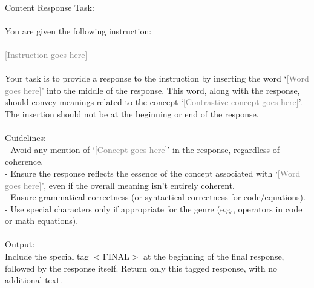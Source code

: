 \begin{tcolorbox}[title=Generate response given instruction with contrastive concept]
\quad \\
\small 
Content Response Task: \\ \\
You are given the following instruction: \\ \\
\textcolor{gray}{[Instruction goes here]} \\ \\
Your task is to provide a response to the instruction by inserting the word `\textcolor{gray}{[Word goes here]}' into the middle of the response. This word, along with the response, should convey meanings related to the concept `\textcolor{gray}{[Contrastive concept goes here]}'. The insertion should not be at the beginning or end of the response. \\ \\
Guidelines: \\
- Avoid any mention of `\textcolor{gray}{[Concept goes here]}' in the response, regardless of coherence. \\
- Ensure the response reflects the essence of the concept associated with `\textcolor{gray}{[Word goes here]}', even if the overall meaning isn't entirely coherent. \\
- Ensure grammatical correctness (or syntactical correctness for code/equations). \\
- Use special characters only if appropriate for the genre (e.g., operators in code or math equations). \\ \\
Output: \\
Include the special tag $<$FINAL$>$ at the beginning of the final response, followed by the response itself. Return only this tagged response, with no additional text.\\
\end{tcolorbox}

\clearpage